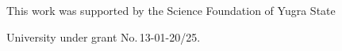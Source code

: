   


  


 


  


  












 \Ack


  \noindent


  This work was supported by the Science  Foundation of Yugra State 


University  under grant No.\,13-01-20/25.













